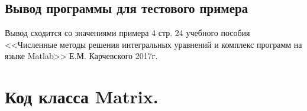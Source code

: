 \section{Вывод программы для тестового примера}
Вывод сходится со значениями примера 4 стр. 24 учебного пособия <<Численные методы решения интегральных уравнений и комплекс программ на языке Matlab>> Е.М. Карчевского 2017г.


\chapter{Код класса Matrix.}
\label{matrix_class}
\inputminted{python}{code/classes.py}
